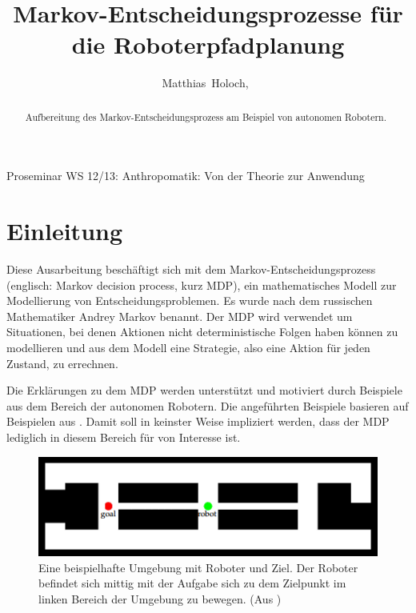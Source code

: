 \documentclass[a4paper]{IEEEtran}
\begin{document}
\title{Markov-Entscheidungsprozesse für die Roboterpfadplanung}

\author{Matthias~Holoch,~}%




%
{Proseminar WS 12/13: Anthropomatik: Von der Theorie zur Anwendung}



\maketitle


\begin{abstract}
Aufbereitung des Markov-Entscheidungsprozess am Beispiel von autonomen Robotern. 
\end{abstract}


\section{Einleitung}
Diese Ausarbeitung beschäftigt sich mit dem Markov-Entscheidungsprozess (englisch: Markov decision process, kurz MDP), ein mathematisches Modell zur Modellierung von Entscheidungsproblemen. Es wurde nach dem russischen Mathematiker Andrey Markov benannt. Der MDP wird verwendet um Situationen, bei denen Aktionen nicht deterministische Folgen haben können zu modellieren und aus dem Modell eine Strategie, also eine Aktion für jeden Zustand, zu errechnen.

Die Erklärungen zu dem MDP werden unterstützt und motiviert durch Beispiele aus dem Bereich der autonomen Robotern. Die angeführten Beispiele basieren auf Beispielen aus \cite{thrun2005probabilistic}. Damit soll in keinster Weise impliziert werden, dass der MDP lediglich in diesem Bereich für von Interesse ist.

\begin{figure}[ht]
	\centering
	\includegraphics[scale=0.72]{images/autnmRobot_basicSituation.png}
	\caption{Eine beispielhafte Umgebung mit Roboter und Ziel. Der Roboter befindet sich mittig mit der Aufgabe sich zu dem Zielpunkt im linken Bereich der Umgebung zu bewegen. (Aus \cite{thrun2005probabilistic})}
	\label{fig:autnmRob_bSit}
\end{figure}
\end{document}
